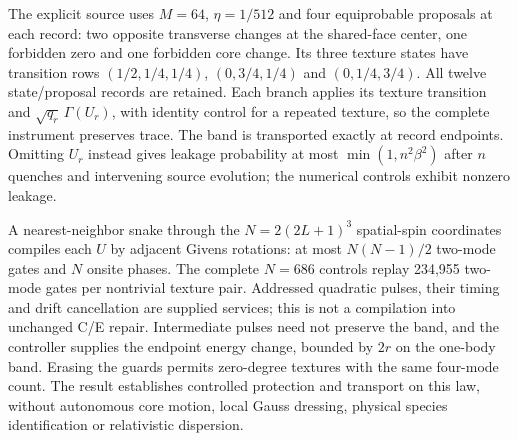 The explicit source uses $M=64$, $\eta=1/512$ and four equiprobable proposals
at each record: two opposite transverse changes at the shared-face center,
one forbidden zero and one forbidden core change. Its three texture states
have transition rows $(1/2,1/4,1/4)$, $(0,3/4,1/4)$ and $(0,1/4,3/4)$.
All twelve state/proposal records are retained. Each branch applies its
texture transition and $\sqrt{q_r}\,\Gamma(U_r)$, with identity control for
a repeated texture, so the complete instrument preserves trace. The band
is transported exactly at record endpoints. Omitting $U_r$ instead gives
leakage probability at most $\min(1,n^2\beta^2)$ after $n$ quenches and
intervening source evolution; the numerical controls exhibit nonzero leakage.

A nearest-neighbor snake through the $N=2(2L+1)^3$ spatial-spin coordinates
compiles each $U$ by adjacent Givens rotations: at most $N(N-1)/2$ two-mode
gates and $N$ onsite phases. The complete $N=686$ controls replay 234,955
two-mode gates per nontrivial texture pair. Addressed quadratic pulses,
their timing and drift cancellation are supplied services; this is not a
compilation into unchanged C/E repair. Intermediate pulses need not preserve
the band, and the controller supplies the endpoint energy change, bounded
by $2r$ on the one-body band. Erasing the guards permits zero-degree textures
with the same four-mode count. The result establishes controlled protection
and transport on this law, without autonomous core motion, local Gauss
dressing, physical species identification or relativistic dispersion.
